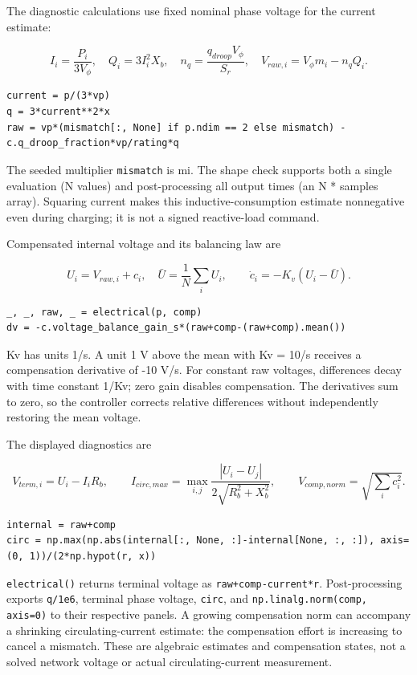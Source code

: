 \documentclass[11pt,a4paper]{article}
\begin{document}
The diagnostic calculations use fixed nominal phase voltage for the current estimate:

\[
I_i=\frac{P_i}{3V_\phi},\quad Q_i=3I_i^2X_b,\quad
n_q=\frac{q_{droop}V_\phi}{S_r},\quad
V_{raw,i}=V_\phi m_i-n_qQ_i.
\]

\begin{lstlisting}
current = p/(3*vp)
q = 3*current**2*x
raw = vp*(mismatch[:, None] if p.ndim == 2 else mismatch) - c.q_droop_fraction*vp/rating*q
\end{lstlisting}

The seeded multiplier \texttt{mismatch} is mi. The shape check supports both a single evaluation (N values) and post-processing all output times (an N  *  samples array). Squaring current makes this inductive-consumption estimate nonnegative even during charging; it is not a signed reactive-load command.

Compensated internal voltage and its balancing law are

\[
U_i=V_{raw,i}+c_i,\quad \bar U=\frac1N\sum_i U_i,\qquad
\dot c_i=-K_v(U_i-\bar U).
\]

\begin{lstlisting}
_, _, raw, _ = electrical(p, comp)
dv = -c.voltage_balance_gain_s*(raw+comp-(raw+comp).mean())
\end{lstlisting}

Kv has units 1/s. A unit 1 V above the mean with Kv = 10/s receives a compensation derivative of -10 V/s. For constant raw voltages, differences decay with time constant 1/Kv; zero gain disables compensation. The derivatives sum to zero, so the controller corrects relative differences without independently restoring the mean voltage.

The displayed diagnostics are

\[
V_{term,i}=U_i-I_iR_b,\qquad
I_{circ,max}=\max_{i,j}\frac{|U_i-U_j|}{2\sqrt{R_b^2+X_b^2}},\qquad
V_{comp,norm}=\sqrt{\sum_i c_i^2}.
\]

\begin{lstlisting}
internal = raw+comp
circ = np.max(np.abs(internal[:, None, :]-internal[None, :, :]), axis=(0, 1))/(2*np.hypot(r, x))
\end{lstlisting}

\texttt{electrical()} returns terminal voltage as \texttt{raw+comp-current*r}. Post-processing exports \texttt{q/1e6}, terminal phase voltage, \texttt{circ}, and \texttt{np.linalg.norm(comp, axis=0)} to their respective panels. A growing compensation norm can accompany a shrinking circulating-current estimate: the compensation effort is increasing to cancel a mismatch. These are algebraic estimates and compensation states, not a solved network voltage or actual circulating-current measurement.
\end{document}
